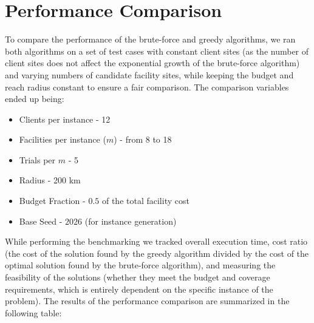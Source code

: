 \documentclass[letterpaper]{article}
\begin{document}
\section{Performance Comparison}
To compare the performance of the brute-force and greedy algorithms, we ran both algorithms on a set of test cases with constant client sites (as the number of client sites does not affect the exponential growth of the brute-force algorithm) and varying numbers of candidate facility sites, while keeping the budget and reach radius constant to ensure a fair comparison. The comparison variables ended up being:

\begin{itemize}
    \item Clients per instance - 12 
    \item Facilities per instance ($m$) - from 8 to 18
    \item Trials per $m$ - 5
    \item Radius - 200 km
    \item Budget Fraction - $0.5$ of the total facility cost
    \item Base Seed - $2026$ (for instance generation)
\end{itemize}

While performing the benchmarking we tracked overall execution time, cost ratio (the cost of the solution found by the greedy algorithm divided by the cost of the optimal solution found by the brute-force algorithm), and measuring the feasibility of the solutions (whether they meet the budget and coverage requirements, which is entirely dependent on the specific instance of the problem). The results of the performance comparison are summarized in the following table:
\end{document}
